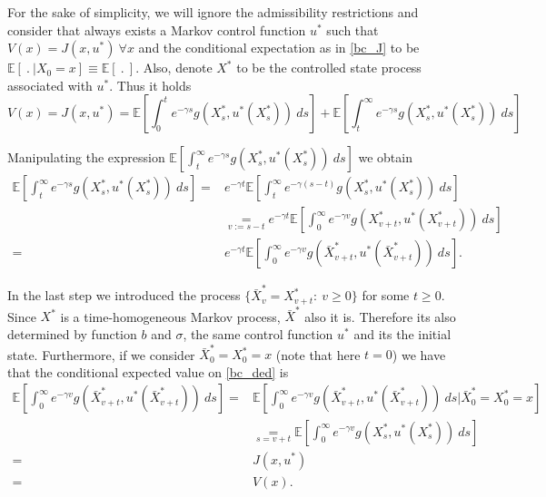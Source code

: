 For the sake of simplicity, we will ignore the admissibility restrictions and consider that always exists a Markov control function $u^*$ such that $V(x)=J(x,u^*) \ \forall x$ and the conditional expectation as in \eqref{bc_J} to be $\mathds{E}\left[\ . \ | X_0=x \right] \equiv \mathds{E}\left[\ . \ \right]$. Also, denote $X^*$ to be the controlled state process associated with $u^*$. Thus it holds
\begin{equation}
V(x)=J(x,u^*)=\mathds{E}\left[ \int^t_0 e^{-\gamma s} g(X^*_s,u^*(X^*_s)) \ ds\right] + \mathds{E}\left[ \int^\infty_t e^{-\gamma s} g(X^*_s,u^*(X^*_s)) \ ds\right]
	\label{bc_V2}
\end{equation}

Manipulating the expression $\mathds{E}\left[ \int^\infty_t e^{-\gamma s} g(X^*_s,u^*(X^*_s)) \ ds\right]$ we obtain
\begin{align}
\mathds{E}\left[ \int^\infty_t e^{-\gamma s} g(X^*_s,u^*(X^*_s)) \ ds\right]
=& e^{-\gamma t}\mathds{E}\left[ \int^\infty_t e^{-\gamma (s-t)}g(X^*_s,u^*(X^*_s)) \ ds\right] \nonumber \\
&\underset{v:=s-t}{=}e^{-\gamma t}\mathds{E}\left[ \int^\infty_0 e^{-\gamma v}g(X^*_{v+t},u^*(X^*_{v+t})) \ ds\right] \nonumber \\
= & e^{-\gamma t}\mathds{E}\left[ \int^\infty_0 e^{-\gamma v}g(\bar{X}^*_{v+t},u^*(\bar{X}^*_{v+t})) \ ds\right]. \label{bc_ded}
\end{align}

In the last step we introduced the process $\{\bar{X}^*_v=X^*_{v+t}: \ v \geq 0\}$ for some $t\geq 0$. Since $X^*$ is a time-homogeneous Markov process, $\bar{X}^*$ also it is. Therefore its also determined by function $b$ and $\sigma$, the same control function $u^*$ and its the initial state. Furthermore, if we consider $ \bar{X}^*_0=X^*_0=x$ (note that here $t=0$) we have that the conditional expected value on \eqref{bc_ded} is
\begin{align}
	\mathds{E}\left[ \int^\infty_0 e^{-\gamma v}g(\bar{X}^*_{v+t},u^*(\bar{X}^*_{v+t})) \ ds\right]
	=& \mathds{E}\left[ \int^\infty_0 e^{-\gamma v}g(\bar{X}^*_{v+t},u^*(\bar{X}^*_{v+t})) \ ds | \bar{X}^*_0=X^*_0=x \right] \nonumber \\
	&\underset{s=v+t}{=}\mathds{E}\left[ \int^\infty_0 e^{-\gamma v}g(X^*_s,u^*(X^*_s)) \ ds  \right] \nonumber \\
	=&J(x,u^*) \nonumber \\
	=&V(x). \label{bc_ded2}
\end{align}

